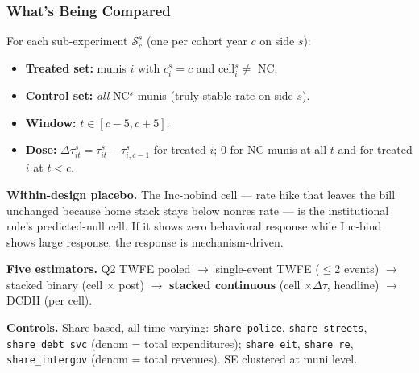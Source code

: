 \documentclass[xcolor = x11names, compress, aspectratio = 169]{beamer}
\begin{document}
    \begin{frame}
    \frametitle{What's Being Compared}
        \footnotesize
        For each sub-experiment $\mathcal{S}^s_c$ (one per cohort year $c$ on side $s$):
        \begin{itemize}\setlength{\itemsep}{0.05cm}\scriptsize
            \item \textbf{Treated set:} munis $i$ with $c^s_i = c$ and cell$^s_i \neq$ NC.
            \item \textbf{Control set:} \emph{all} NC$^s$ munis (truly stable rate on side $s$).
            \item \textbf{Window:} $t \in [c-5, c+5]$.
            \item \textbf{Dose:} $\Delta\tau^s_{it} = \tau^s_{it} - \tau^s_{i,c-1}$ for treated $i$;
            $0$ for NC munis at all $t$ and for treated $i$ at $t < c$.
        \end{itemize}
        \medskip

        \textbf{Within-design placebo.} The Inc-nobind cell --- rate hike that
        leaves the bill unchanged because home stack stays below nonres rate ---
        is the institutional rule's predicted-null cell. If it shows zero behavioral
        response while Inc-bind shows large response, the response is mechanism-driven.
        \medskip

        \textbf{Five estimators.} Q2 TWFE pooled $\to$ single-event TWFE ($\le$2 events) $\to$
        stacked binary (cell $\times$ post) $\to$ \alert{\textbf{stacked continuous}
        (cell $\times \Delta\tau$, \alert{headline})} $\to$ DCDH (per cell).
        \medskip

        \textbf{Controls.} Share-based, all time-varying:
        \texttt{share\_police}, \texttt{share\_streets}, \texttt{share\_debt\_svc}
        (denom = total expenditures); \texttt{share\_eit}, \texttt{share\_re},
        \texttt{share\_intergov} (denom = total revenues).
        SE clustered at muni level.
    \end{frame}
\end{document}
